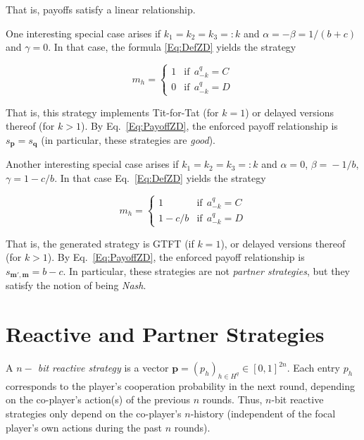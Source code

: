 \documentclass{article}
\theoremstyle{definition}
\begin{document}
That is, payoffs satisfy a linear relationship. 

One interesting special case arises if $k_1\!=\!k_2\!=\!k_3\!=:\!k$ and $\alpha
= -\beta =1/(b\!+\!c)$ and $\gamma=0$. In that case, the formula
\eqref{Eq:DefZD} yields the strategy

\begin{equation}
m_h = \left\{
\begin{array}{ll}
1	&\text{if}~~a^q_{-k}=C\\
0	&\text{if}~~a^q_{-k}=D
\end{array}
\right.
\end{equation}

That is, this strategy implements Tit-for-Tat (for $k\!=\!1$) or delayed
versions thereof (for $k\!>\!1$). By Eq.~\eqref{Eq:PayoffZD}, the enforced
payoff relationship is $s_\mathbf{p}\!=\! s_\mathbf{q}$ (in particular, these
strategies are {\it good}). 

Another interesting special case arises if  $k_1\!=\!k_2\!=\!k_3\!=:\!k$ and
$\alpha\!=\!0$, $\beta\!=\!-1/b$, $\gamma\!=\!1\!-\!c/b$. In that case
Eq.~\eqref{Eq:DefZD} yields the strategy

\begin{equation}
m_h = \left\{
\begin{array}{ll}
1	&\text{if}~~a^q_{-k}=C\\
1-c/b	&\text{if}~~a^q_{-k}=D
\end{array}
\right.
\end{equation}

That is, the generated strategy is GTFT (if $k\!=\!1$), or delayed versions
thereof (for $k\!>\!1$). By Eq.~\eqref{Eq:PayoffZD}, the enforced payoff
relationship is $s_{\mathbf{m'}, \mathbf{m}}\!=\!b\!-\!c$. In particular, these
strategies are not {\it partner strategies}, but they satisfy the notion of
being {\it Nash}.\\


\section{Reactive and Partner Strategies}\label{section:reactive_strategies}

A {\it $n-$ bit reactive strategy} is a vector $\mathbf{p}=(p_h)_{h\in
H^q}\in[0,1]^{2n}$. Each entry $p_h$ corresponds to the player's cooperation
probability in the next round, depending on the co-player's action(s) of the
previous \(n\) rounds. Thus, \(n\)-bit reactive strategies only depend on the
co-player's \(n\)-history (independent of the focal player's own actions during
the past \(n\) rounds).
\end{document}
